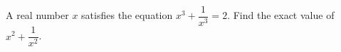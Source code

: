 A real number $x$ satisfies the equation $x^{3}+\dfrac{1}{x^{3}}=2$. Find the exact value of $x^{2}+\dfrac{1}{x^{2}}$.
